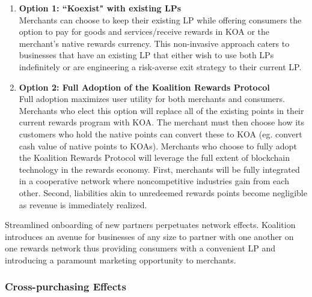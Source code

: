 \begin{enumerate}
\item \textbf{Option 1: ``Koexist" with existing LPs} \\
Merchants can choose to keep their existing LP while offering consumers the option to pay for goods and services/receive rewards in KOA or the merchant's native rewards currency. This non-invasive approach caters to businesses that have an existing LP that either wish to use both LPs indefinitely or are engineering a risk-averse exit strategy to their current LP.

\item \textbf{Option 2: Full Adoption of the Koalition Rewards Protocol} \\
Full adoption maximizes user utility for both merchants and consumers. Merchants who elect this option will replace all of the existing points in their current rewards program with KOA. The merchant must then choose how its customers who hold the native points can convert these to KOA (eg. convert cash value of native points to KOAs). Merchants who choose to fully adopt the Koalition Rewards Protocol will leverage the full extent of blockchain technology in the rewards economy. First, merchants will be fully integrated in a cooperative network where noncompetitive industries gain from each other. Second, liabilities akin to unredeemed rewards points become negligible as revenue is immediately realized.
\end{enumerate}

Streamlined onboarding of new partners perpetuates network effects. Koalition introduces an avenue for businesses of any size to partner with one another on one rewards network thus providing consumers with a convenient LP and introducing a paramount marketing opportunity to merchants. 

\subsubsection{Cross-purchasing Effects}

